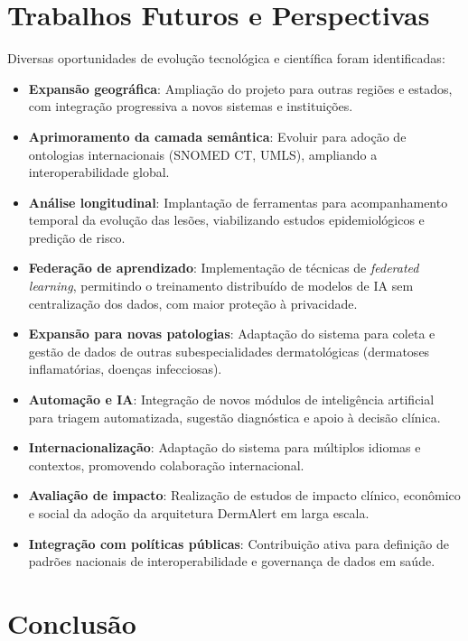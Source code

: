 \section{Trabalhos Futuros e Perspectivas}

Diversas oportunidades de evolução tecnológica e científica foram identificadas:

\begin{itemize}
    \item \textbf{Expansão geográfica}: Ampliação do projeto para outras regiões e estados, com integração progressiva a novos sistemas e instituições.
    \item \textbf{Aprimoramento da camada semântica}: Evoluir para adoção de ontologias internacionais (SNOMED CT, UMLS), ampliando a interoperabilidade global.
    \item \textbf{Análise longitudinal}: Implantação de ferramentas para acompanhamento temporal da evolução das lesões, viabilizando estudos epidemiológicos e predição de risco.
    \item \textbf{Federação de aprendizado}: Implementação de técnicas de \textit{federated learning}, permitindo o treinamento distribuído de modelos de IA sem centralização dos dados, com maior proteção à privacidade.
    \item \textbf{Expansão para novas patologias}: Adaptação do sistema para coleta e gestão de dados de outras subespecialidades dermatológicas (dermatoses inflamatórias, doenças infecciosas).
    \item \textbf{Automação e IA}: Integração de novos módulos de inteligência artificial para triagem automatizada, sugestão diagnóstica e apoio à decisão clínica.
    \item \textbf{Internacionalização}: Adaptação do sistema para múltiplos idiomas e contextos, promovendo colaboração internacional.
    \item \textbf{Avaliação de impacto}: Realização de estudos de impacto clínico, econômico e social da adoção da arquitetura DermAlert em larga escala.
    \item \textbf{Integração com políticas públicas}: Contribuição ativa para definição de padrões nacionais de interoperabilidade e governança de dados em saúde.
\end{itemize}

\section{Conclusão}

